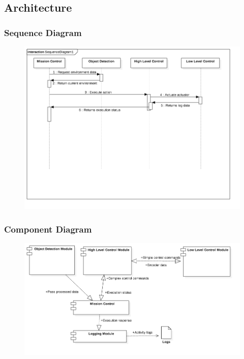 \documentclass{beamer}
\begin{document}
\subsection{Architecture}
\begin{frame}
\frametitle{Sequence Diagram}
\begin{figure}[H]
\centering
\includegraphics[scale=0.36]{assets/diagrams/SequenceDiagram.png}
\end{figure}
\end{frame}

\begin{frame}
\frametitle{Component Diagram}
\begin{figure}[H]
\centering
\includegraphics[scale=0.36]{assets/diagrams/ComponentDiagram.png}
\end{figure}
\end{frame}
\end{document}
